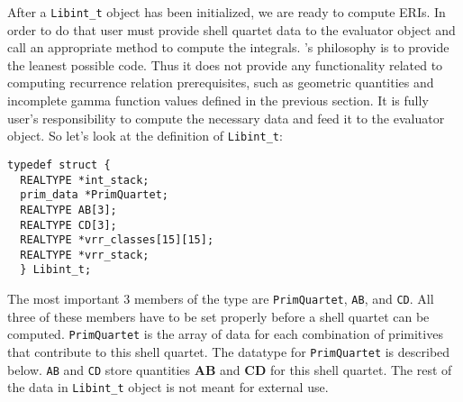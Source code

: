 \documentclass[12pt]{article}
\begin{document}
After a {\tt Libint\_t} object has been initialized,
we are ready to compute ERIs. In order to do that user must provide
shell quartet data to the evaluator object and call an appropriate method
to compute the integrals.
\LIBINT 's philosophy is to provide the leanest possible code. Thus it does not provide any functionality
related to computing recurrence relation prerequisites, such as geometric quantities and incomplete gamma
function values defined in the previous section. It is fully user's responsibility to compute the necessary
data and feed it to the evaluator object.
So let's look at the definition of {\tt Libint\_t}:
\begin{verbatim}
typedef struct {
  REALTYPE *int_stack;
  prim_data *PrimQuartet;
  REALTYPE AB[3];
  REALTYPE CD[3];
  REALTYPE *vrr_classes[15][15];
  REALTYPE *vrr_stack;
  } Libint_t;
\end{verbatim}
The most important 3 members of the type are {\tt PrimQuartet}, {\tt AB}, and
{\tt CD}. All three of these members have to be set properly before a shell quartet can be computed.
{\tt PrimQuartet} is the array of data for each combination of primitives that
contribute to this shell quartet. The datatype for {\tt PrimQuartet} is described below.
{\tt AB} and {\tt CD} store quantities {\bf AB} and {\bf CD} for this shell quartet.
The rest of the data in {\tt Libint\_t} object is not meant for external use.
\end{document}
